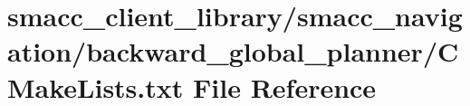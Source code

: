 \hypertarget{client__library_2smacc__navigation_2backward__global__planner_2CMakeLists_8txt}{}\section{smacc\+\_\+client\+\_\+library/smacc\+\_\+navigation/backward\+\_\+global\+\_\+planner/\+C\+Make\+Lists.txt File Reference}
\label{client__library_2smacc__navigation_2backward__global__planner_2CMakeLists_8txt}
